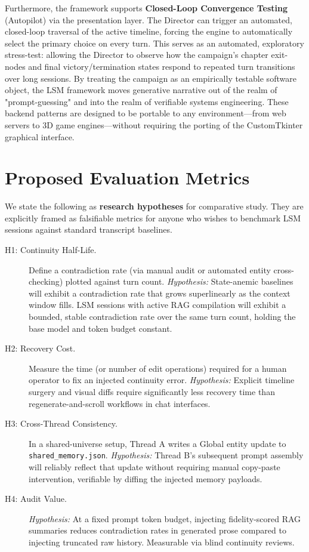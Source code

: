\documentclass[12pt, a4paper]{article}
\begin{document}
Furthermore, the framework supports \textbf{Closed-Loop Convergence Testing} (Autopilot) via the presentation layer. The Director can trigger an automated, closed-loop traversal of the active timeline, forcing the engine to automatically select the primary choice on every turn. This serves as an automated, exploratory stress-test: allowing the Director to observe how the campaign’s chapter exit-nodes and final victory/termination states respond to repeated turn transitions over long sessions. By treating the campaign as an empirically testable software object, the LSM framework moves generative narrative out of the realm of "prompt-guessing" and into the realm of verifiable systems engineering. These backend patterns are designed to be portable to any environment---from web servers to 3D game engines---without requiring the porting of the CustomTkinter graphical interface.


\newpage
\section{Proposed Evaluation Metrics}
\label{sec:falsifiability}

We state the following as \textbf{research hypotheses} for comparative study. They are explicitly framed as falsifiable metrics for anyone who wishes to benchmark LSM sessions against standard transcript baselines.

\begin{description}
    \item[H1: Continuity Half-Life.] Define a contradiction rate (via manual audit or automated entity cross-checking) plotted against turn count. \textit{Hypothesis:} State-anemic baselines will exhibit a contradiction rate that grows superlinearly as the context window fills. LSM sessions with active RAG compilation will exhibit a bounded, stable contradiction rate over the same turn count, holding the base model and token budget constant.

    \item[H2: Recovery Cost.] Measure the time (or number of edit operations) required for a human operator to fix an injected continuity error. \textit{Hypothesis:} Explicit timeline surgery and visual diffs require significantly less recovery time than regenerate-and-scroll workflows in chat interfaces.

    \item[H3: Cross-Thread Consistency.] In a shared-universe setup, Thread A writes a Global entity update to \texttt{shared\_memory.json}. \textit{Hypothesis:} Thread B's subsequent prompt assembly will reliably reflect that update without requiring manual copy-paste intervention, verifiable by diffing the injected memory payloads.

    \item[H4: Audit Value.] \textit{Hypothesis:} At a fixed prompt token budget, injecting fidelity-scored RAG summaries reduces contradiction rates in generated prose compared to injecting truncated raw history. Measurable via blind continuity reviews.
\end{description}
\end{document}
